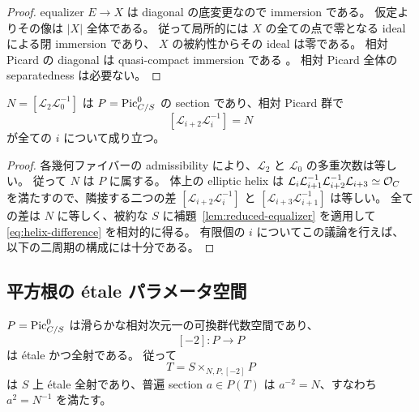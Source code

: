 \begin{proof}
equalizer $E\to X$ は diagonal の底変更なので immersion である。
仮定よりその像は $|X|$ 全体である。
従って局所的には $X$ の全ての点で零となる ideal による閉 immersion であり、
$X$ の被約性からその ideal は零である。
相対 Picard の diagonal は quasi-compact immersion である
\cite[Lemma 108.9.2]{StacksRelativePicard}。
相対 Picard 全体の separatedness は必要ない。
\end{proof}

\begin{lemma}\label{lem:relative-helix-difference}
$N=[\mathcal L_2\mathcal L_0^{-1}]$ は $P=\operatorname{Pic}^0_{C/S}$ の section であり、相対 Picard 群で
\[
 [\mathcal L_{i+2}\mathcal L_i^{-1}]=N
 \tag{PR-4}\label{eq:helix-difference}
\]
が全ての $i$ について成り立つ。
\end{lemma}

\begin{proof}
各幾何ファイバーの admissibility により、$\mathcal L_2$ と $\mathcal L_0$ の多重次数は等しい。
従って $N$ は $P$ に属する。
体上の elliptic helix は
$\mathcal L_i\mathcal L_{i+1}^{-1}\mathcal L_{i+2}^{-1}\mathcal L_{i+3}\simeq\mathcal O_C$
を満たすので、隣接する二つの差
$[\mathcal L_{i+2}\mathcal L_i^{-1}]$ と $[\mathcal L_{i+3}\mathcal L_{i+1}^{-1}]$ は等しい。
全ての差は $N$ に等しく、被約な $S$ に補題~\ref{lem:reduced-equalizer} を適用して
\eqref{eq:helix-difference} を相対的に得る。
有限個の $i$ についてこの議論を行えば、以下の二周期の構成には十分である。
\end{proof}

\subsection{平方根の étale パラメータ空間}

\begin{lemma}\label{lem:picard-halves}
$P=\operatorname{Pic}^0_{C/S}$ は滑らかな相対次元一の可換群代数空間であり、
\[
 [-2]:P\longrightarrow P
\]
は étale かつ全射である。
従って
\[
 T=S\mathbin{\times}_{N,P,[-2]}P
 \tag{PR-5}\label{eq:T}
\]
は $S$ 上 étale 全射であり、普遍 section $a\in P(T)$ は
$a^{-2}=N$、すなわち $a^2=N^{-1}$ を満たす。
\end{lemma}

